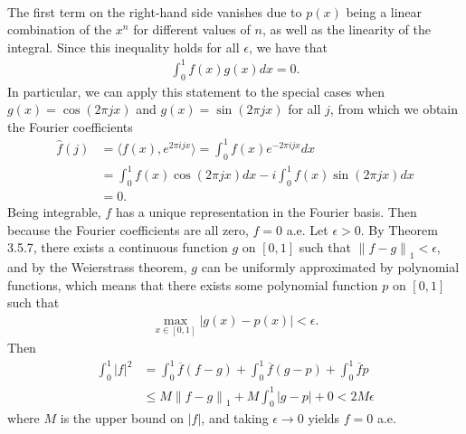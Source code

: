 \documentclass[a4paper,12pt]{article}
\newcommand{\norm}[1]{\left\lVert#1\right\rVert}
\begin{document}
\begin{enumerate}
\begin{align*}
            \end{align*}
            The first term on the right-hand side vanishes due to $p(x)$ being a linear combination of the $x^n$ for different values of $n$, as well as the linearity of the integral. Since this inequality holds for all $\epsilon$, we have that
            \begin{align}
                \int_0^1 f(x) g(x) dx = 0.
            \end{align}
            In particular, we can apply this statement to the special cases when $g(x) = \cos(2\pi jx)$ and $g(x) = \sin(2\pi jx)$ for all $j$, from which we obtain the Fourier coefficients
            \begin{align*}
                \hat{f}(j) &= \langle f(x), e^{2\pi ijx} \rangle = \int_0^1 f(x) e^{-2\pi ijx} dx \\
                &= \int_0^1 f(x) \cos(2\pi jx) dx - i \int_0^1 f(x) \sin(2\pi jx) dx \\
                &= 0.
            \end{align*}
            Being integrable, $f$ has a unique representation in the Fourier basis. Then because the Fourier coefficients are all zero, $f = 0$ a.e.
        \fi
        Let $\epsilon > 0$. By Theorem 3.5.7, there exists a continuous function $g$ on $[0, 1]$ such that $\norm{f - g}_1 < \epsilon$, and by the Weierstrass theorem, $g$ can be uniformly approximated by polynomial functions, which means that there exists some polynomial function $p$ on $[0, 1]$ such that
        \begin{align*}
            \max_{x \in [0, 1]} |g(x) - p(x)| < \epsilon.
        \end{align*}
        Then
        \begin{align*}
            \int_0^1 |f|^2 &= \int_0^1 \overline{f}(f - g) + \int_0^1 \overline{f} (g - p) + \int_0^1 \overline{f} p \\
            &\leq M\norm{f - g}_1 + M \int_0^1 |g - p| + 0 < 2M\epsilon
        \end{align*}
        where $M$ is the upper bound on $|f|$, and taking $\epsilon \to 0$ yields $f = 0$ a.e.
\end{enumerate}
\end{document}
